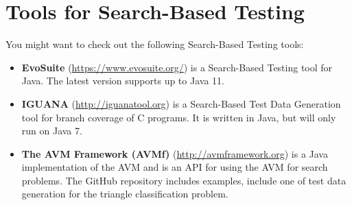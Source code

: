 
\section{Tools for Search-Based Testing}

You might want to check out the following Search-Based Testing tools:

\begin{itemize}

    \item {\bf EvoSuite} (\url{https://www.evosuite.org/}) is a Search-Based
    Testing tool for Java. The latest version supports up to Java 11.

    \item {\bf IGUANA} (\url{http://iguanatool.org}) is a Search-Based Test Data
    Generation tool for branch coverage of C programs. It is written in Java,
    but will only run on Java 7.

    \item {\bf The AVM Framework (AVMf)} (\url{http://avmframework.org}) is a
    Java implementation of the AVM and is an API for using the AVM for search
    problems. The GitHub repository includes examples, include one of test data
    generation for the triangle classification problem.

\end{itemize}

